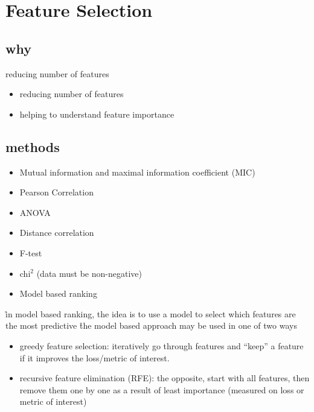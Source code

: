 \section{Feature Selection}


\subsection{why}

reducing number of features
\begin{itemize}[noitemsep,topsep=0pt]
	\item reducing number of features
	\item helping to understand feature importance
\end{itemize}

\subsection{methods}





\begin{itemize}[noitemsep,topsep=0pt]
	\item Mutual information and maximal information coefficient (MIC)
	\item Pearson Correlation
	\item ANOVA
	\item Distance correlation
	\item F-test
	\item chi$^2$ (data must be non-negative)
	\item Model based ranking
\end{itemize}

\r{in model based ranking, the idea is to use a model to select which features are the most predictive}
\r{the model based approach may be used in one of two ways}
\begin{itemize}[noitemsep,topsep=0pt]
	\item greedy feature selection: iteratively go through features and ``keep'' a feature if it improves the loss/metric of interest. 
	\item recursive feature elimination (RFE): the opposite, start with all features, then remove them one by one as a result of least importance (measured on loss or metric of interest)
\end{itemize}





